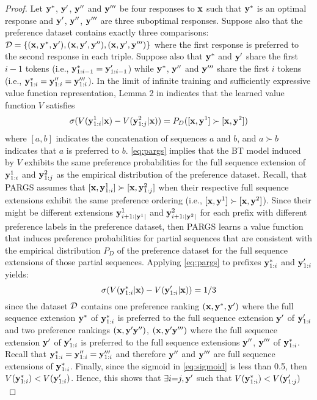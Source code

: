 \begin{proof}
Let ${\mathbf{y}}^*$, ${\mathbf{y}}'$, ${\mathbf{y}}''$ and ${\mathbf{y}}'''$ be four responses to ${\mathbf{x}}$ such that ${\mathbf{y}}^*$ is an optimal response and ${\mathbf{y}}'$, ${\mathbf{y}}''$, ${\mathbf{y}}'''$ are three suboptimal responses.  Suppose also that the preference dataset contains exactly three comparisons:  $\mathcal{D}=\{({\mathbf{x}},{\mathbf{y}}^*,{\mathbf{y}}'), ({\mathbf{x}},{\mathbf{y}}',{\mathbf{y}}''), ({\mathbf{x}},{\mathbf{y}}',{\mathbf{y}}''')\}$ where the first response is preferred to the second response in each triple.  Suppose also that ${\mathbf{y}}^*$ and ${\mathbf{y}}'$ share the first $i-1$ tokens (i.e., ${\mathbf{y}}^*_{1:i-1} = {\mathbf{y}}'_{1:i-1}$) while ${\mathbf{y}}^*$, ${\mathbf{y}}''$ and ${\mathbf{y}}'''$ share the first $i$ tokens (i.e., ${\mathbf{y}}^*_{1:i} = {\mathbf{y}}''_{1:i} = {\mathbf{y}}'''_{1:i}$). In the limit of infinite training and sufficiently expressive value function representation, Lemma 2 in \cite{rashid2024critical} indicates that the learned value function $V$ satisfies
\begin{equation}
\label{eq:pargs}
    \sigma(V({\mathbf{y}}^1_{1:i}|{\mathbf{x}}) - V({\mathbf{y}}^2_{1:j}|{\mathbf{x}})) = P_D([{\mathbf{x}},{\mathbf{y}}^1] \succ [{\mathbf{x}},{\mathbf{y}}^2])
\end{equation}
where $[a,b]$ indicates the concatenation of sequences $a$ and $b$, and $a\succ b$ indicates that $a$ is preferred to $b$.  \cref{eq:pargs} implies that the BT model induced by $V$ exhibits the same preference probabilities for the full sequence extension of ${\mathbf{y}}^1_{1:i}$ and ${\mathbf{y}}^2_{1:j}$ as the empirical distribution of the preference dataset.  Recall, that PARGS assumes that $[{\mathbf{x}},{\mathbf{y}}^1_{1:i}] \succ [{\mathbf{x}},{\mathbf{y}}^2_{1:j}]$ when their respective full sequence extensions exhibit the same preference ordering (i.e., $[{\mathbf{x}},{\mathbf{y}}^1] \succ [{\mathbf{x}},{\mathbf{y}}^2]$).  Since their might be different extensions ${\mathbf{y}}^1_{i+1:|{\mathbf{y}}^1|}$ and ${\mathbf{y}}^2_{i+1:|{\mathbf{y}}^2|}$ for each prefix with different preference labels in the preference dataset, then PARGS learns a value function that induces preference probabilities for partial sequences that are consistent with the empirical distribution $P_D$ of the preference dataset for the full sequence extensions of those partial sequences.  Applying \cref{eq:pargs} to prefixes ${\mathbf{y}}^*_{1:i}$ and ${\mathbf{y}}'_{1:i}$ yields:
\begin{equation}
\label{eq:sigmoid}
    \sigma(V({\mathbf{y}}^*_{1:i}|{\mathbf{x}}) - V({\mathbf{y}}'_{1:i}|{\mathbf{x}})) = 1/3
\end{equation}
since the dataset $\mathcal{D}$ contains one preference ranking $({\mathbf{x}},{\mathbf{y}}^*,{\mathbf{y}}')$ where the full sequence extension ${\mathbf{y}}^*$ of ${\mathbf{y}}^*_{1:i}$ is preferred to the full sequence extension ${\mathbf{y}}'$ of ${\mathbf{y}}'_{1:i}$ and two preference rankings $({\mathbf{x}},{\mathbf{y}}'{\mathbf{y}}'')$, $({\mathbf{x}},{\mathbf{y}}'{\mathbf{y}}''')$ where the full sequence extension ${\mathbf{y}}'$ of ${\mathbf{y}}'_{1:i}$ is preferred to the full sequence extensions ${\mathbf{y}}''$, ${\mathbf{y}}'''$ of ${\mathbf{y}}^*_{1:i}$. 
Recall that ${\mathbf{y}}^*_{1:i}={\mathbf{y}}''_{1:i}={\mathbf{y}}'''_{1:i}$ and therefore ${\mathbf{y}}''$ and ${\mathbf{y}}'''$ are full sequence extensions of ${\mathbf{y}}^*_{1:i}$. Finally, since the sigmoid in \cref{eq:sigmoid} is less than 0.5, then $V({\mathbf{y}}^*_{1:i}) < V({\mathbf{y}}'_{1:i})$.  Hence, this shows that $\exists i{=}j,{\mathbf{y}}'$ such that $V({\mathbf{y}}^*_{1:i}) < V({\mathbf{y}}'_{1:j})$
\end{proof}

